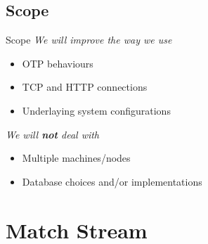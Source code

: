 \documentclass[utf8]{beamer}
\begin{document}
\subsection{Scope}
\begin{frame}{Scope}
	\emph{We will improve the way we use}
	\begin{itemize}
		\item OTP behaviours
		\item TCP and HTTP connections
		\item Underlaying system configurations
	\end{itemize}
	\pause
	\emph{We will \textbf{not} deal with}
	\begin{itemize}
		\item Multiple machines/nodes
		\item Database choices and/or implementations
	\end{itemize}
\end{frame}

\section{Match Stream}
\end{document}
